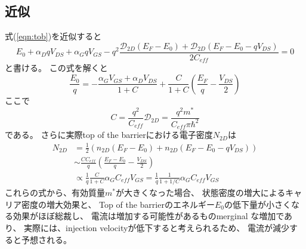 \documentclass[11pt,uplatex,a4paper]{jsarticle}
\begin{document}
  \subsection{近似}
式(\ref{eqn:tob})を近似すると
\begin{equation}
 E_0 + \alpha_D q V_{DS} + \alpha_G q V_{GS} -
  q^2\frac{\mathcal{D}_{2D}(E_F - E_0)+\mathcal{D}_{2D}(E_F-E_0-qV_{DS})}{2 C_{eff}}=0
\end{equation}
と書ける。
 この式を解くと
 \begin{equation}
  \frac{E_0}{q} = -\frac{\alpha_G V_{GS} + \alpha_D V_{DS}}{1+C}
   + \frac{C}{1+C} (\frac{E_{F}}{q}-\frac{V_{DS}}{2})
 \end{equation}
 ここで
\begin{equation}
 C=\frac{q^2}{C_{eff}}\mathcal{D}_{2D} = \frac{q^2m^*}{C_{eff}\pi \hbar^2}
\end{equation}
である。
さらに実際top of the barrierにおける電子密度$N_{2D}$は
\begin{equation}
 \begin{split}
 N_{2D} &= \frac{1}{2}
  (n_{2D}(E_F-E_0) + n_{2D}(E_F-E_0-qV_{DS})) \\
  &\sim \frac{C C_{eff}}{q} (\frac{E_F - E_0}{q} - \frac{V_{DS}}{2}) \\
  &\propto \frac{1}{q}\frac{C}{1+C} \alpha_G C_{eff} V_{GS}
  = \frac{1}{q}\frac{1}{1+1/C} \alpha_G C_{eff} V_{GS}
 \end{split}
\end{equation}
これらの式から、有効質量$m^*$が大きくなった場合、
状態密度の増大によるキャリア密度の増大効果と、
Top of the barrierのエネルギー$E_0$の低下量が小さくなる効果がほぼ総裁し、
電流は増加する可能性があるものmerginal な増加であり、
実際には、injection velocityが低下すると考えられるため、
電流が減少すると予想される。


\appendix
\end{document}
